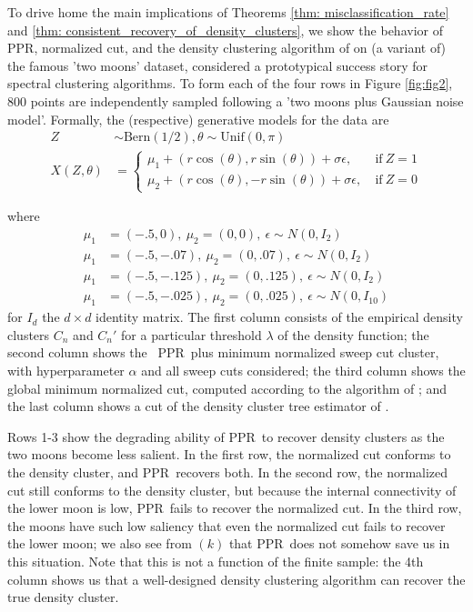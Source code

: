 \documentclass{article}
\newcommand{\1}{\mathbf{1}}
\newcommand{\ppr}{{\sc PPR}}
\newcommand{\pprspace}{{\sc PPR~}}
\theoremstyle{aldenthm}
\theoremstyle{aldenrmrk}
\begin{document}
To drive home the main implications of Theorems \ref{thm: misclassification_rate} and \ref{thm: consistent_recovery_of_density_clusters}, we show the behavior of \ppr, normalized cut, and the density clustering algorithm of \citep{chaudhuri2010} on (a variant of) the famous 'two moons' dataset, considered a prototypical success story for spectral clustering algorithms. To form each of the four rows in Figure \ref{fig:fig2}, 800 points are independently sampled following a 'two moons plus Gaussian noise model'. Formally, the (respective) generative models for the data are
\begin{align}
Z & \sim \textrm{Bern}(1/2), \theta \sim \textrm{Unif}(0, \pi) \\
X(Z,\theta) & = 
\begin{cases}
\mu_1 + (r \cos(\theta), r \sin(\theta)) + \sigma \epsilon,~ & \text{if}~ Z = 1 \\
\mu_2 + (r \cos(\theta), - r \sin(\theta)) + \sigma \epsilon,~ & \text{if}~ Z = 0
\end{cases}
\end{align}

where 
\begin{align*}
\mu_1 & = (-.5, 0),~ \mu_2 = (0,0),~ \epsilon \sim N(0, I_2) \tag{row 1} \\
\mu_1 & = (-.5, -.07),~ \mu_2 = (0,.07),~ \epsilon \sim N(0, I_2) \tag{row 2} \\
\mu_1 & = (-.5, -.125),~ \mu_2 = (0,.125),~ \epsilon \sim N(0, I_2) \tag{row 3} \\
\mu_1 & = (-.5, -.025),~ \mu_2 = (0,.025),~ \epsilon \sim N(0, I_{10}) \tag{row 4}
\end{align*}
for $I_d$ the $d \times d$ identity matrix. The first column consists of the empirical density clusters $C_n$ and $C_n'$ for a particular threshold $\lambda$ of the density function; the second column shows the ~\pprspace plus minimum normalized sweep cut cluster, with hyperparameter $\alpha$ and all sweep cuts considered; the third column shows the global minimum normalized cut, computed according to the algorithm of \cite{szlam2010}; and the last column shows a cut of the density cluster tree estimator of \cite{chaudhuri2010}.

Rows 1-3 show the degrading ability of \pprspace to recover density clusters as the two moons become less salient. In the first row, the normalized cut conforms to the density cluster, and \pprspace recovers both. In the second row, the normalized cut still conforms to the density cluster, but because the internal connectivity of the lower moon is low, \pprspace fails to recover the normalized cut. In the third row, the moons have such low saliency that even the normalized cut fails to recover the lower moon; we also see from $(k)$ that \pprspace does not somehow save us in this situation. Note that this is not a function of the finite sample: the 4th column shows us that a well-designed density clustering algorithm can recover the true density cluster.
\end{document}
